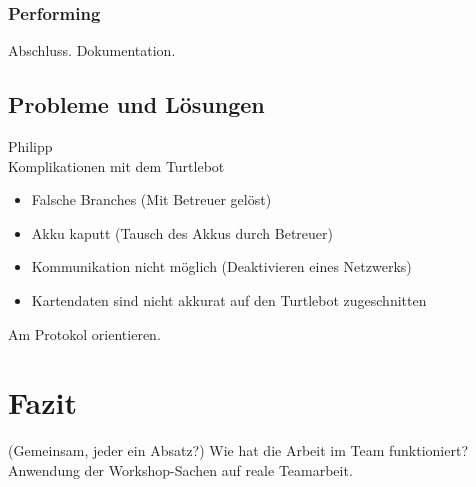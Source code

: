 \documentclass[a4paper,12pt,headsepline]{scrartcl}
\begin{document}
	\subsubsection{Performing}
		Abschluss. Dokumentation.
	\subsection{Probleme und Lösungen}
		Philipp\\
		Komplikationen mit dem Turtlebot
		\begin{itemize}
			\item Falsche Branches (Mit Betreuer gelöst)
			\item Akku kaputt (Tausch des Akkus durch Betreuer)
			\item Kommunikation nicht möglich (Deaktivieren eines Netzwerks)
			\item Kartendaten sind nicht akkurat auf den Turtlebot zugeschnitten
		\end{itemize}
		Am Protokol orientieren.
	\section{Fazit}
		(Gemeinsam, jeder ein Absatz?)
		Wie hat die Arbeit im Team funktioniert? Anwendung der Workshop-Sachen auf reale Teamarbeit.
\end{document}
